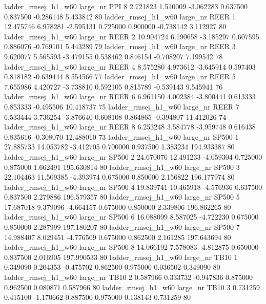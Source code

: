 ladder_rmsej_h1_w60   large_nr      PPI                 8  2.721823  1.510009  -3.062283 0.637500 0.837500 -0.286148    5.433842 80
ladder_rmsej_h1_w60   large_nr     REER                 1 12.475746  6.978281  -2.595131 0.725000 0.900000 -0.738142    3.112927 80
ladder_rmsej_h1_w60   large_nr     REER                 2 10.904724  6.190658  -3.185297 0.607595 0.886076 -0.769101    5.443289 79
ladder_rmsej_h1_w60   large_nr     REER                 3  9.620077  5.565593  -3.479155 0.538462 0.846154 -0.708207    7.199542 78
ladder_rmsej_h1_w60   large_nr     REER                 4  8.575280  4.973612  -3.645914 0.597403 0.818182 -0.639444    8.554566 77
ladder_rmsej_h1_w60   large_nr     REER                 5  7.655986  4.420727  -3.738810 0.592105 0.815789 -0.539143    9.545941 76
ladder_rmsej_h1_w60   large_nr     REER                 6  6.961150  4.002384  -3.800441 0.613333 0.853333 -0.495506   10.418737 75
ladder_rmsej_h1_w60   large_nr     REER                 7  6.533444  3.736254  -3.876640 0.608108 0.864865 -0.394807   11.412026 74
ladder_rmsej_h1_w60   large_nr     REER                 8  6.253248  3.584778  -3.959748 0.616438 0.835616 -0.308070   12.488010 73
ladder_rmsej_h1_w60   large_nr    SP500                 1 27.885733 14.053782  -3.412705 0.700000 0.937500  1.383234  194.933387 80
ladder_rmsej_h1_w60   large_nr    SP500                 2 24.670076 12.491233  -4.059304 0.725000 0.875000  1.662491  195.630814 80
ladder_rmsej_h1_w60   large_nr    SP500                 3 22.104463 11.509385  -4.393974 0.675000 0.850000  2.156822  196.177974 80
ladder_rmsej_h1_w60   large_nr    SP500                 4 19.839741 10.465918  -4.576936 0.637500 0.837500  2.279886  196.579357 80
ladder_rmsej_h1_w60   large_nr    SP500                 5 17.687018  9.379096  -4.664157 0.675000 0.850000  2.339806  196.862265 80
ladder_rmsej_h1_w60   large_nr    SP500                 6 16.088099  8.587025  -4.722230 0.675000 0.850000  2.287999  197.180207 80
ladder_rmsej_h1_w60   large_nr    SP500                 7 14.988407  8.029451  -4.776509 0.675000 0.862500  2.161285  197.643694 80
ladder_rmsej_h1_w60   large_nr    SP500                 8 14.066192  7.578083  -4.812875 0.650000 0.837500  2.016905  197.990533 80
ladder_rmsej_h1_w60   large_nr     TB10                 1  0.349090  0.204353  -0.475702 0.862500 0.975000  0.036502    0.349090 80
ladder_rmsej_h1_w60   large_nr     TB10                 2  0.587966  0.333732  -0.947836 0.875000 0.962500  0.080871    0.587966 80
ladder_rmsej_h1_w60   large_nr     TB10                 3  0.731259  0.415100  -1.170662 0.887500 0.975000  0.138143    0.731259 80
